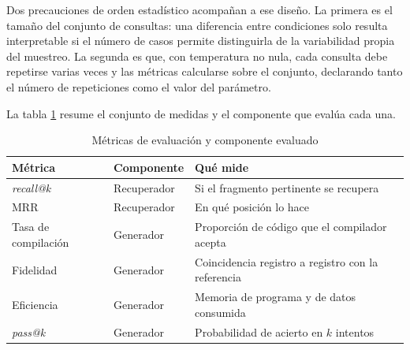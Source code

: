 Dos precauciones de orden estadístico acompañan a ese diseño. La primera es el
tamaño del conjunto de consultas: una diferencia entre condiciones solo resulta
interpretable si el número de casos permite distinguirla de la variabilidad
propia del muestreo. La segunda es que, con temperatura no nula, cada consulta
debe repetirse varias veces y las métricas calcularse sobre el conjunto,
declarando tanto el número de repeticiones como el valor del parámetro.

La tabla \ref{tab:metricas} resume el conjunto de medidas y el componente que
evalúa cada una.

\begin{table}[H]
  \centering
  \caption{Métricas de evaluación y componente evaluado}
  \label{tab:metricas}
  \begin{tabular}{@{}llp{}@{}}
    \toprule
    \textbf{Métrica} & \textbf{Componente} & \textbf{Qué mide} \\
    \midrule
    \emph{recall@k} & Recuperador & Si el fragmento pertinente se recupera \\
    MRR & Recuperador & En qué posición lo hace \\
    Tasa de compilación & Generador & Proporción de código que el compilador acepta \\
    Fidelidad & Generador & Coincidencia registro a registro con la referencia \\
    Eficiencia & Generador & Memoria de programa y de datos consumida \\
    \emph{pass@k} & Generador & Probabilidad de acierto en $k$ intentos \\
    \bottomrule
  \end{tabular}
\end{table}
